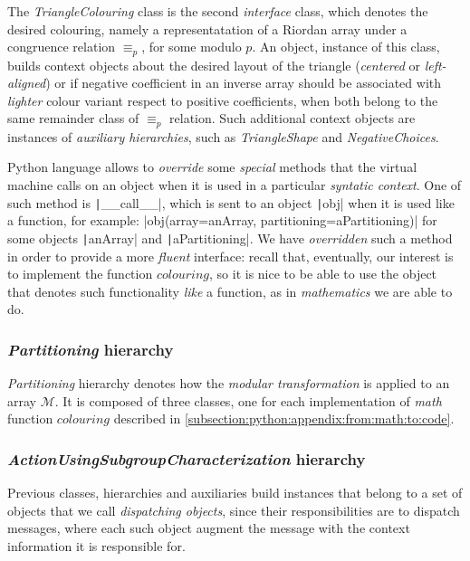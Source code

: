 The \emph{TriangleColouring} class is the second \emph{interface} class, which
denotes the desired colouring, namely a representatation of a Riordan array
under a congruence relation $\equiv_{p}$, for some modulo $p$. An object,
instance of this class, builds context objects about the desired layout of the
triangle (\emph{centered} or \emph{left-aligned}) or if negative coefficient in
an inverse array should be associated with \emph{lighter} colour variant
respect to positive coefficients, when both belong to the same remainder class of
$\equiv_{p}$ relation. Such additional context objects are instances of
\emph{auxiliary hierarchies}, such as \emph{TriangleShape} and
\emph{NegativeChoices}.

Python language allows to \emph{override} some \emph{special} methods that the
virtual machine calls on an object when it is used in a particular
\emph{syntatic context}.  One of such method is \texttt|__call__|, which is sent
to an object \texttt|obj| when it is used like a function, for
example: |obj(array=anArray, partitioning=aPartitioning)| for some
objects \texttt|anArray| and \texttt|aPartitioning|. We
have \emph{overridden} such a method in order to provide a more \emph{fluent}
interface: recall that, eventually, our interest is to implement the function
$colouring$, so it is nice to be able to use the object that denotes such
functionality \emph{like} a function, as in \emph{mathematics} we are able to
do. 

\subsubsection{\emph{Partitioning} hierarchy}

\emph{Partitioning} hierarchy denotes how the \emph{modular transformation} is
applied to an array $\mathcal{M}$. It is composed of three classes, one for
each implementation of \emph{math} function $colouring$ described in
\autoref{subsection:python:appendix:from:math:to:code}.

\subsubsection{\emph{ActionUsingSubgroupCharacterization} hierarchy}

Previous classes, hierarchies and auxiliaries build instances that belong to a
set of objects that we call \emph{dispatching objects}, since their responsibilities
are to dispatch messages, where each such object augment the message with the
context information it is responsible for. 

